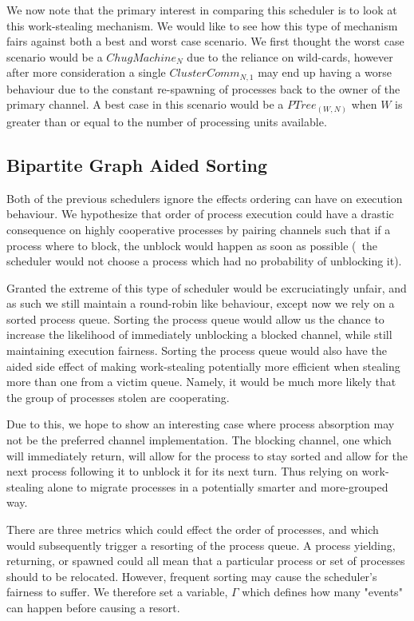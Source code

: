 We now note that the primary interest in comparing this scheduler is to look at 
this work-stealing mechanism.
We would like to see how this type of mechanism fairs against both a best and
worst case scenario. We first thought the worst case scenario would be a 
$ChugMachine_N$ due to the reliance on wild-cards, however after more 
consideration a single $ClusterComm_{N,1}$ may end up having a worse behaviour
due to the constant re-spawning of processes back to the owner of the primary
channel. A best case in this scenario would be a $PTree_{(W,N)}$ when $W$ is greater than or equal
to the number of processing units available.

\subsection{Bipartite Graph Aided Sorting}
    \label{sec:bipartite graph aided sorting}

Both of the previous schedulers ignore the effects ordering
can have on execution behaviour. We hypothesize that order of process execution
could have a drastic consequence on highly cooperative processes by pairing 
channels such that if a process where to block, the unblock would happen as soon
as possible (\ie~the scheduler would not choose a process which had no probability of unblocking it).

Granted the extreme of this type of scheduler would be excruciatingly unfair, and
as such we still maintain a round-robin like behaviour, except now we rely on 
a sorted process queue. Sorting the process queue would allow us the chance to 
increase the likelihood of immediately unblocking a blocked channel, while still
maintaining execution fairness. 
Sorting the process queue would also have the aided side effect of making 
work-stealing potentially more efficient when stealing more than one from a 
victim queue. Namely, it would be much more likely that the group of processes
stolen are cooperating. 

Due to this, we hope to show an interesting case where process absorption may 
not be the preferred channel implementation. The blocking channel, one which will
immediately return, will allow for the process to stay sorted and allow for the 
next process following it to unblock it for its next turn. Thus relying on 
work-stealing alone to migrate processes in a potentially smarter and 
more-grouped way.

There are three metrics which could effect the order of processes, and which would
subsequently trigger a resorting of the process queue. A process yielding, 
returning, or spawned could all mean that a particular process or set of 
processes should to be relocated. However, frequent sorting may cause the scheduler's
fairness to suffer. We therefore set a variable, $\Gamma$ which defines how many 
"events" can happen before causing a resort.

